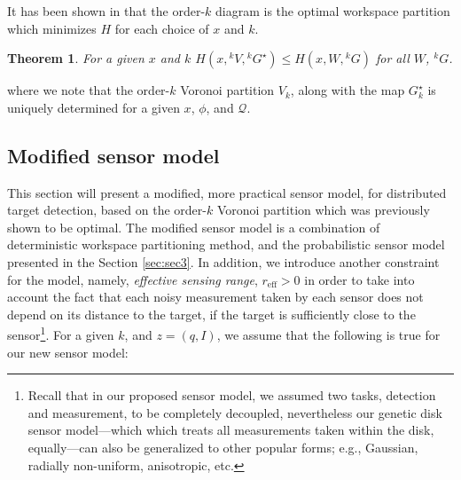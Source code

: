 \documentclass[journal]{IEEEtran}
\newtheorem{lemma}{Lemma}[section]
\newtheorem{theorem}{Theorem}[section]
\begin{document}
It has been shown in \cite{park2014robust} that the order-$k$ diagram is the optimal workspace partition which minimizes $H$ for each choice of $x$ and $k$.
\begin{theorem}
	For a given $x$ and $k$
	$
	H(x,{}^{k}V,{}^kG^{\star}) \leq H(x,W,{}^{k}G)
	$
	for all $W$, ${}^{k}G$.
\end{theorem}
\noindent where we note that the order-$k$ Voronoi partition $V_k$, along with the map $G_k^{\star}$ is uniquely determined for a given $x$, $\phi$, and $\mathcal{Q}$. 

\subsection{Modified sensor model}
This section will present a modified, more practical sensor model, for distributed target detection, based on the order-$k$ Voronoi partition which was previously shown to be optimal.
The modified sensor model is a combination of deterministic workspace partitioning method, and the probabilistic sensor model presented in the Section \ref{sec:sec3}. In addition, we introduce another constraint for the model, namely, \emph{effective sensing range},  $r_{\text{eff}} >0$ in order to take into account the fact that each noisy measurement taken by each sensor does not depend on its distance to the target, if the target is sufficiently close to the sensor\footnote{Recall that in our proposed sensor model, we assumed two tasks, detection and measurement, to be completely decoupled, nevertheless our genetic disk sensor model---which which treats all measurements taken within the disk, equally---can also be generalized to other popular forms; e.g., Gaussian, radially non-uniform, anisotropic, etc.}. 
For a given $k$, and $z = (q,I)$, we assume that the following is true for our new sensor model:
\end{document}
